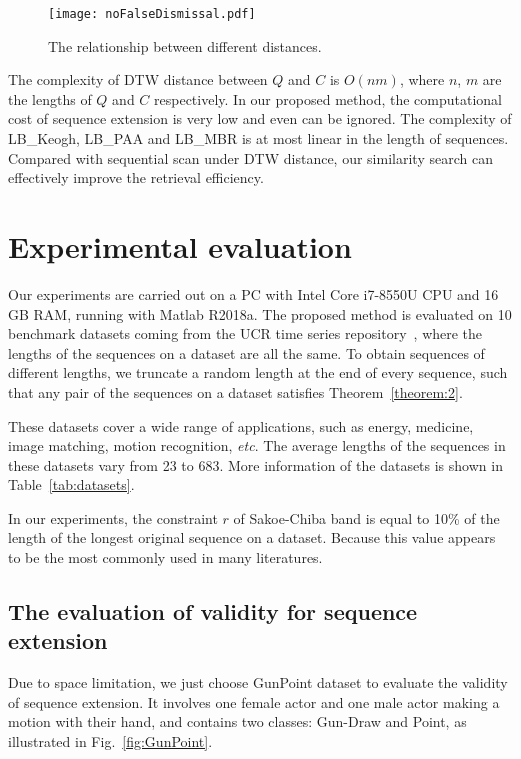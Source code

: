 \documentclass[10pt,journal,compsoc]{IEEEtran}
\begin{document}
\begin{figure}[htbp]
  \centering
  \texttt{[image: noFalseDismissal.pdf]}
  \caption{The relationship between different distances.}
  \label{fig:noFalseDismissal}
\end{figure}

The complexity of DTW distance between $Q$ and $C$ is $O(nm)$,
where $n$, $m$ are the lengths of $Q$ and $C$ respectively.
In our proposed method,
the computational cost of sequence extension is very low and even can be ignored.
The complexity of LB\_Keogh, LB\_{PAA} and LB\_MBR is at most linear in the length of sequences.
Compared with sequential scan under DTW distance,
our similarity search can effectively improve the retrieval efficiency.


\section{Experimental evaluation}\label{sec:experiments}

Our experiments are carried out on a PC with Intel Core i7-8550U CPU and 16 GB RAM,
running with Matlab R2018a.
The proposed method is evaluated on 10 benchmark datasets coming from the UCR time series repository~\cite{UCRDataSet},
where the lengths of the sequences on a dataset are all the same.
To obtain sequences of different lengths, we truncate a random length at the end of every sequence,
such that any pair of the sequences on a dataset satisfies Theorem~\ref{theorem:2}.

These datasets cover a wide range of applications, such as energy, medicine, image matching, motion recognition, \emph{etc}.
The average lengths of the sequences in these datasets vary from 23 to 683.
More information of the datasets is shown in Table~\ref{tab:datasets}.

In our experiments,
the constraint $r$ of Sakoe-Chiba band is equal to 10\% of the length of the longest original sequence on a dataset.
Because this value appears to be the most commonly used in many literatures.



\subsection{The evaluation of validity for sequence extension}


Due to space limitation,
we just choose GunPoint dataset to evaluate the validity of sequence extension.
It involves one female actor and one male actor making a motion with their hand,
and contains two classes: Gun-Draw and Point,
as illustrated in Fig.~\ref{fig:GunPoint}.
\end{document}
